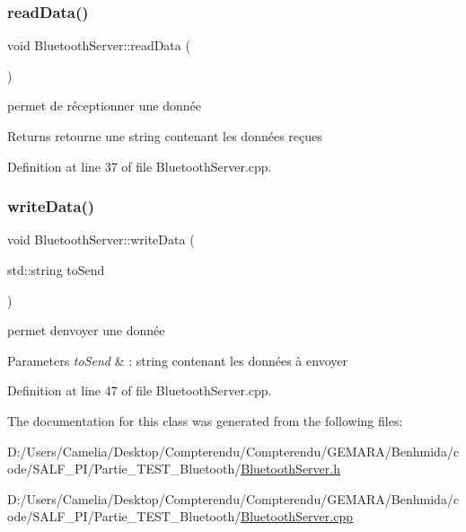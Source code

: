 \subsubsection{\texorpdfstring{read\+Data()}{readData()}}
{\footnotesize\ttfamily void Bluetooth\+Server\+::read\+Data (\begin{DoxyParamCaption}{ }\end{DoxyParamCaption})}



permet de réceptionner une donnée 


\begin{DoxyItemize}
\item \begin{DoxyReturn}{Returns}
retourne une string contenant les données reçues 
\end{DoxyReturn}

\end{DoxyItemize}

Definition at line 37 of file Bluetooth\+Server.\+cpp.

\mbox{\label{class_bluetooth_server_a3c7deee96780cb1ca20e0debc3daafe6}} 
\subsubsection{\texorpdfstring{write\+Data()}{writeData()}}
{\footnotesize\ttfamily void Bluetooth\+Server\+::write\+Data (\begin{DoxyParamCaption}\item[{std\+::string}]{to\+Send }\end{DoxyParamCaption})}



permet d\textquotesingle{}envoyer une donnée 


\begin{DoxyItemize}
\item 
\begin{DoxyParams}{Parameters}
{\em to\+Send} & \+: string contenant les données à envoyer \\
\hline
\end{DoxyParams}

\end{DoxyItemize}

Definition at line 47 of file Bluetooth\+Server.\+cpp.



The documentation for this class was generated from the following files\+:\begin{DoxyCompactItemize}
\item 
D\+:/\+Users/\+Camelia/\+Desktop/\+Compterendu/\+Compterendu/\+G\+E\+M\+A\+R\+A/\+Benhmida/code/\+S\+A\+L\+F\+\_\+\+P\+I/\+Partie\+\_\+\+T\+E\+S\+T\+\_\+\+Bluetooth/\hyperlink{_bluetooth_server_8h}{Bluetooth\+Server.\+h}\item 
D\+:/\+Users/\+Camelia/\+Desktop/\+Compterendu/\+Compterendu/\+G\+E\+M\+A\+R\+A/\+Benhmida/code/\+S\+A\+L\+F\+\_\+\+P\+I/\+Partie\+\_\+\+T\+E\+S\+T\+\_\+\+Bluetooth/\hyperlink{_bluetooth_server_8cpp}{Bluetooth\+Server.\+cpp}\end{DoxyCompactItemize}
